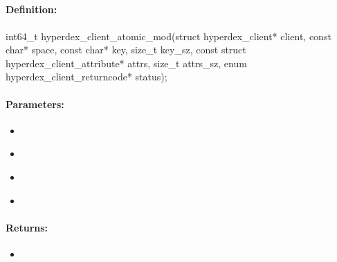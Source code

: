 \pagebreak
\subsection{}
\label{api:c:atomic_mod}


\paragraph{Definition:}
\begin{ccode}
int64_t hyperdex_client_atomic_mod(struct hyperdex_client* client,
        const char* space,
        const char* key, size_t key_sz,
        const struct hyperdex_client_attribute* attrs, size_t attrs_sz,
        enum hyperdex_client_returncode* status);
\end{ccode}

\paragraph{Parameters:}
\begin{itemize}[noitemsep]
\item {}\\

\item {}\\

\item {}\\

\item {}\\

\end{itemize}

\paragraph{Returns:}
\begin{itemize}[noitemsep]
\item {}\\

\end{itemize}

